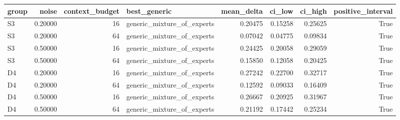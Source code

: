 \begin{tabular}{lrrlrrrr}
\toprule
group & noise & context_budget & best_generic & mean_delta & ci_low & ci_high & positive_interval \\
\midrule
S3 & 0.20000 & 16 & generic_mixture_of_experts & 0.20475 & 0.15258 & 0.25625 & True \\
S3 & 0.20000 & 64 & generic_mixture_of_experts & 0.07042 & 0.04775 & 0.09834 & True \\
S3 & 0.50000 & 16 & generic_mixture_of_experts & 0.24425 & 0.20058 & 0.29059 & True \\
S3 & 0.50000 & 64 & generic_mixture_of_experts & 0.15850 & 0.12058 & 0.20425 & True \\
D4 & 0.20000 & 16 & generic_mixture_of_experts & 0.27242 & 0.22700 & 0.32717 & True \\
D4 & 0.20000 & 64 & generic_mixture_of_experts & 0.12592 & 0.09033 & 0.16409 & True \\
D4 & 0.50000 & 16 & generic_mixture_of_experts & 0.26667 & 0.20925 & 0.31967 & True \\
D4 & 0.50000 & 64 & generic_mixture_of_experts & 0.21192 & 0.17442 & 0.25234 & True \\
\bottomrule
\end{tabular}
